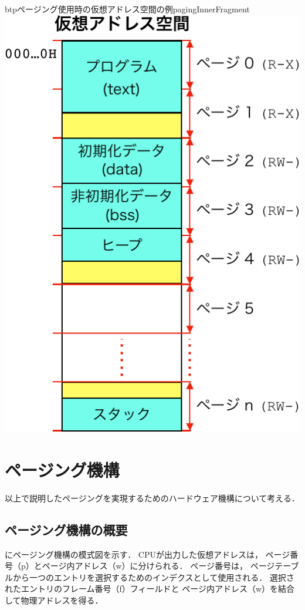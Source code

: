 \begin{myfig}{btp}{ページング使用時の仮想アドレス空間の例}{pagingInnerFragment}
  \includegraphics[scale=0.66]{Fig/pagingInnerFragment-crop.pdf}
\end{myfig}

\section{ページング機構}
以上で説明したページングを実現するためのハードウェア機構について考える．

\subsection{ページング機構の概要}
にページング機構の模式図を示す．
CPUが出力した仮想アドレスは，
ページ番号（p）とページ内アドレス（w）に分けられる．
ページ番号は，
ページテーブルから一つのエントリを選択するためのインデクスとして使用される．
選択されたエントリのフレーム番号（f）フィールドと
ページ内アドレス（w）を結合して物理アドレスを得る．

